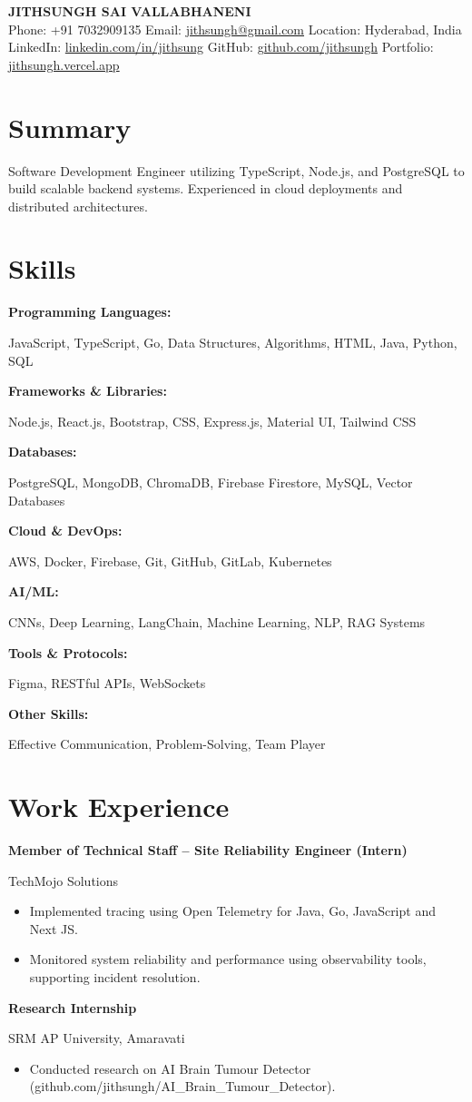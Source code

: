 \documentclass[a4paper,10pt]{article}
\newcommand{\tworow}[2]{%
  \noindent%
  \begin{minipage}[t]{0.615\textwidth}\raggedright #1\end{minipage}%
  \hfill%
  \begin{minipage}[t]{0.365\textwidth}\raggedleft #2\end{minipage}%
  \par%
}
\newcommand{\resumeheader}[3]{%
  \begin{center}
    {\LARGE \textbf{#1}} \\[0.5em]
    \small #2 \\[0.3em]
    \small #3
  \end{center}
}
\newcommand{\expentry}[3]{%
  \tworow{\textbf{#1}}{#2}%
  \ifx\relax#3\relax\else\textit{\small #3}\par\fi
}
\newenvironment{rbullets}{%
  \vspace{0.12em}%
  \begin{itemize}[leftmargin=1.1em, labelsep=0.4em, label=\textbullet,
                  itemsep=0.12em, topsep=0.08em, parsep=0pt, partopsep=0pt]%
}{%
  \end{itemize}%
}
\newcommand{\entrygap}{\vspace{0.55em}}
\newcommand{\skillrow}[2]{%
  \noindent%
  \begin{minipage}[t]{0.27\textwidth}\raggedright\textbf{#1}\end{minipage}%
  \begin{minipage}[t]{0.73\textwidth}\raggedright #2\end{minipage}%
  \par\vspace{0.18em}%
}
\begin{document}
\resumeheader{JITHSUNGH SAI VALLABHANENI}{%
  Phone: +91 7032909135 \quad  Email: \href{mailto:jithsungh@gmail.com}{jithsungh@gmail.com} \quad  Location: Hyderabad, India }{%
  LinkedIn: \href{https://linkedin.com/in/jithsung}{linkedin.com/in/jithsung} \quad  GitHub: \href{https://github.com/jithsungh}{github.com/jithsungh} \quad  Portfolio: \href{https://jithsungh.vercel.app}{jithsungh.vercel.app} }

\section*{Summary}
Software Development Engineer utilizing TypeScript, Node.js, and PostgreSQL to build scalable backend systems. Experienced in cloud deployments and distributed architectures.

\section*{Skills}
\skillrow{Programming Languages:}{JavaScript, TypeScript, Go, Data Structures, Algorithms, HTML, Java, Python, SQL}
\skillrow{Frameworks \& Libraries:}{Node.js, React.js, Bootstrap, CSS, Express.js, Material UI, Tailwind CSS}
\skillrow{Databases:}{PostgreSQL, MongoDB, ChromaDB, Firebase Firestore, MySQL, Vector Databases}
\skillrow{Cloud \& DevOps:}{AWS, Docker, Firebase, Git, GitHub, GitLab, Kubernetes}
\skillrow{AI/ML:}{CNNs, Deep Learning, LangChain, Machine Learning, NLP, RAG Systems}
\skillrow{Tools \& Protocols:}{Figma, RESTful APIs, WebSockets}
\skillrow{Other Skills:}{Effective Communication, Problem-Solving, Team Player}

\section*{Work Experience}
\expentry{Member of Technical Staff -- Site Reliability Engineer (Intern)}{TechMojo Solutions}{}
\begin{rbullets}
  \item Implemented tracing using Open Telemetry for Java, Go, JavaScript and Next JS.
  \item Monitored system reliability and performance using observability tools, supporting incident resolution.
\end{rbullets}
\entrygap
\expentry{Research Internship}{SRM AP University, Amaravati}{}
\begin{rbullets}
  \item Conducted research on AI Brain Tumour Detector (github.com/jithsungh/AI\_Brain\_Tumour\_Detector).
\end{rbullets}
\end{document}

